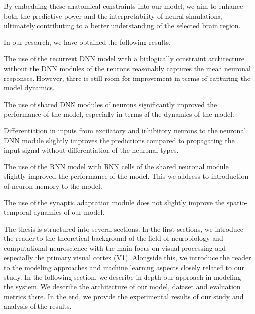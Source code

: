 By embedding these anatomical constraints into our model, we aim to
enhance both the predictive power and the interpretability of neural simulations,
ultimately contributing to a better understanding of the selected brain region.

In our research, we have obtained the following results. 
\begin{description}
    \item The use of the recurrent DNN model with a biologically constraint architecture without the DNN modules of the neurons reasonably captures the mean neuronal responses. However, there is still room for improvement in terms of capturing the model dynamics.
    \item The use of shared DNN modules of neurons significantly improved the performance of the model, especially in terms of the dynamics of the model.
    \item Differentiation in inputs from excitatory and inhibitory neurons to the neuronal DNN module slightly improves the predictions compared to propagating the input signal without differentiation of the neuronal types.
    \item The use of the RNN model with RNN cells of the shared neuronal module slightly improved the performance of the model. This we address to introduction of neuron memory to the model.
    \item The use of the synaptic adaptation module does not slightly improve the spatio-temporal dynamics of our model.
\end{description}

The thesis is structured into several sections. In the first sections,
we introduce the reader to the theoretical background of the field of neurobiology and computational
neuroscience with the main focus on visual processing and especially
the primary visual cortex (V1). Alongside this, we introduce the
reader to the modeling approaches and machine learning aspects
closely related to our study. In the following section, we
describe in depth our approach in modeling the system. We
describe the architecture of our model, dataset and evaluation
metrics there. In the end, we provide the experimental
results of our study and analysis of the results.